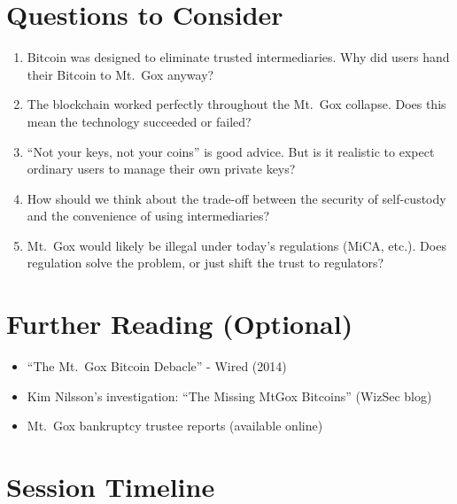 \documentclass[11pt]{article}
\begin{document}
\section*{Questions to Consider}

\begin{enumerate}[leftmargin=*]
\item Bitcoin was designed to eliminate trusted intermediaries. Why did users hand their Bitcoin to Mt.\ Gox anyway?

\item The blockchain worked perfectly throughout the Mt.\ Gox collapse. Does this mean the technology succeeded or failed?

\item ``Not your keys, not your coins'' is good advice. But is it realistic to expect ordinary users to manage their own private keys?

\item How should we think about the trade-off between the security of self-custody and the convenience of using intermediaries?

\item Mt.\ Gox would likely be illegal under today's regulations (MiCA, etc.). Does regulation solve the problem, or just shift the trust to regulators?
\end{enumerate}

\section*{Further Reading (Optional)}

\begin{itemize}[leftmargin=*]
\item ``The Mt.\ Gox Bitcoin Debacle'' - Wired (2014)
\item Kim Nilsson's investigation: ``The Missing MtGox Bitcoins'' (WizSec blog)
\item Mt.\ Gox bankruptcy trustee reports (available online)
\end{itemize}

\newpage


\section*{Session Timeline}
\end{document}
